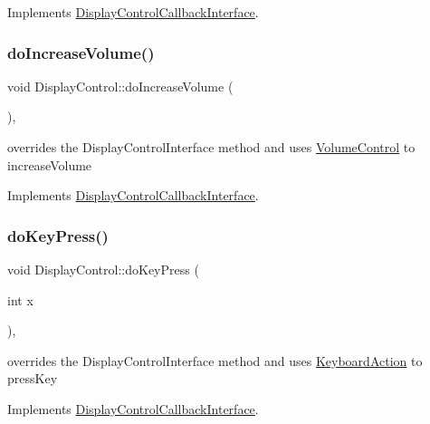 Implements \hyperlink{classDisplayControlCallbackInterface_a55f329e2ab41d237f03b166349d2467e}{Display\+Control\+Callback\+Interface}.

\mbox{\label{classDisplayControl_a8a361b4c25ef55b86b5c2d178ffa516f}} 
\subsubsection{\texorpdfstring{do\+Increase\+Volume()}{doIncreaseVolume()}}
{\footnotesize\ttfamily void Display\+Control\+::do\+Increase\+Volume (\begin{DoxyParamCaption}{ }\end{DoxyParamCaption})\hspace{0.3cm}{\ttfamily [override]}, {\ttfamily [virtual]}}

overrides the Display\+Control\+Interface method and uses \hyperlink{classVolumeControl}{Volume\+Control} to increase\+Volume 

Implements \hyperlink{classDisplayControlCallbackInterface_a78d7afe70cf3d2f524824efe087f0069}{Display\+Control\+Callback\+Interface}.

\mbox{\label{classDisplayControl_aa5af48425f7ba40012b2a7db5fabed45}} 
\subsubsection{\texorpdfstring{do\+Key\+Press()}{doKeyPress()}}
{\footnotesize\ttfamily void Display\+Control\+::do\+Key\+Press (\begin{DoxyParamCaption}\item[{int}]{x }\end{DoxyParamCaption})\hspace{0.3cm}{\ttfamily [override]}, {\ttfamily [virtual]}}

overrides the Display\+Control\+Interface method and uses \hyperlink{classKeyboardAction}{Keyboard\+Action} to press\+Key 

Implements \hyperlink{classDisplayControlCallbackInterface_afdf32e210ff484bfd669b9de84c94dba}{Display\+Control\+Callback\+Interface}.

